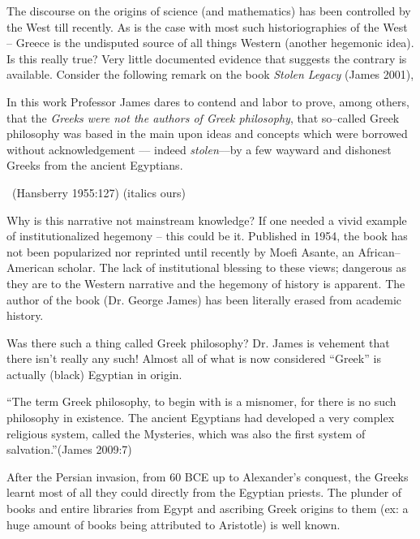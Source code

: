 The discourse on the origins of science (and mathematics) has been controlled by the West till recently. As is the case with most such historiographies of the West – Greece is the undisputed source of all things Western (another hegemonic idea). Is this really true? Very little documented evidence that suggests the contrary is available. Consider the following remark on the book \textit{Stolen Legacy} (James 2001),

\begin{myquote}
In this work Professor James dares to contend and labor to prove, among others, that the \textit{Greeks were not the authors of Greek philosophy}, that so–called Greek philosophy was based in the main upon ideas and concepts which were borrowed without acknowledgement –– indeed \textit{stolen}––by a few wayward and dishonest Greeks from the ancient Egyptians. 

~\hfill (Hansberry 1955:127) (italics ours)
\end{myquote}

Why is this narrative not mainstream knowledge? If one needed a vivid example of institutionalized hegemony – this could be it. Published in 1954, the book has not been popularized nor reprinted until recently by Moefi Asante, an African–American scholar. The lack of institutional blessing to these views; dangerous as they are to the Western narrative and the hegemony of history is apparent. The author of the book (Dr. George James) has been literally erased from academic history.

Was there such a thing called Greek philosophy? Dr. James is vehement that there isn’t really any such! Almost all of what is now considered “Greek” is actually (black) Egyptian in origin.

\begin{myquote}
“The term Greek philosophy, to begin with is a misnomer, for there is no such philosophy in existence. The ancient Egyptians had developed a very complex religious system, called the Mysteries, which was also the first system of salvation.”\hfill (James 2009:7)
\end{myquote}

After the Persian invasion, from 60 BCE up to Alexander’s conquest, the Greeks learnt most of all they could directly from the Egyptian priests. The plunder of books and entire libraries from Egypt and ascribing Greek origins to them (ex: a huge amount of books being attributed to Aristotle) is well known.

